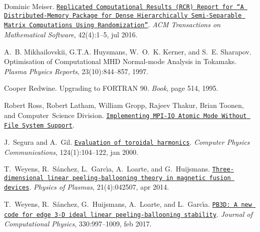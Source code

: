 \begin{DoxyDescription}
\item[\label{_CITEREF_Meiser2016}%
\mbox{[}9\mbox{]}]Dominic Meiser. \href{http://dl.acm.org/citation.cfm?doid=2956571.2929907}{\tt Replicated Computational Results (R\+CR) Report for “A Distributed-\/\+Memory Package for Dense Hierarchically Semi-\/\+Separable Matrix Computations Using Randomization”}. {\itshape A\+CM Transactions on Mathematical Software}, 42(4)\+:1--5, jul 2016. 


\item[\label{_CITEREF_mikhailovskii1997optimization}%
\mbox{[}10\mbox{]}]A.~B. Mikhailovskii, G.\+T.\+A. Huysmans, W.~O.~K. Kerner, and S.~E. Sharapov. Optimisation of Computational M\+HD Normal-\/mode Analysis in Tokamaks. {\itshape Plasma Physics Reports}, 23(10)\+:844--857, 1997.


\item[\label{_CITEREF_RedwineF90}%
\mbox{[}11\mbox{]}]Cooper Redwine. Upgrading to F\+O\+R\+T\+R\+AN 90. {\itshape Book}, page 514, 1995. 


\item[\label{_CITEREF_RossAtomicIO}%
\mbox{[}12\mbox{]}]Robert Ross, Robert Latham, William Gropp, Rajeev Thakur, Brian Toonen, and Computer~Science Division. \href{http://www.mcs.anl.gov/~thakur/papers/atomic-mode.pdf}{\tt Implementing M\+P\+I-\/\+IO Atomic Mode Without File System Support}.


\item[\label{_CITEREF_Segura2000}%
\mbox{[}13\mbox{]}]J.~Segura and A.~Gil. \href{http://linkinghub.elsevier.com/retrieve/pii/S0010465599004282
  https://ptp.jinr.ru/programs/cpc_ind8/ADKV.html
  http://cpc.cs.qub.ac.uk/summaries/ADKV_v1_0.html}{\tt Evaluation of toroidal harmonics}. {\itshape Computer Physics Communications}, 124(1)\+:104--122, jan 2000. 


\item[\label{_CITEREF_weyens2014theory}%
\mbox{[}14\mbox{]}]T.~Weyens, R.~S\'{a}nchez, L.~Garc\'{\i}a, A.~Loarte, and G.~Huijsmans. \href{http://aip.scitation.org/doi/10.1063/1.4871859}{\tt Three-\/dimensional linear peeling-\/ballooning theory in magnetic fusion devices}. {\itshape Physics of Plasmas}, 21(4)\+:042507, apr 2014. 


\item[\label{_CITEREF_Weyens2017PB3D}%
\mbox{[}15\mbox{]}]T.~Weyens, R.~S\'{a}nchez, G.~Huijsmans, A.~Loarte, and L.~Garc\'{\i}a. \href{http://linkinghub.elsevier.com/retrieve/pii/S0021999116305629}{\tt P\+B3\+D\+: A new code for edge 3-\/D ideal linear peeling-\/ballooning stability}. {\itshape Journal of Computational Physics}, 330\+:997--1009, feb 2017. 



\end{DoxyDescription}
